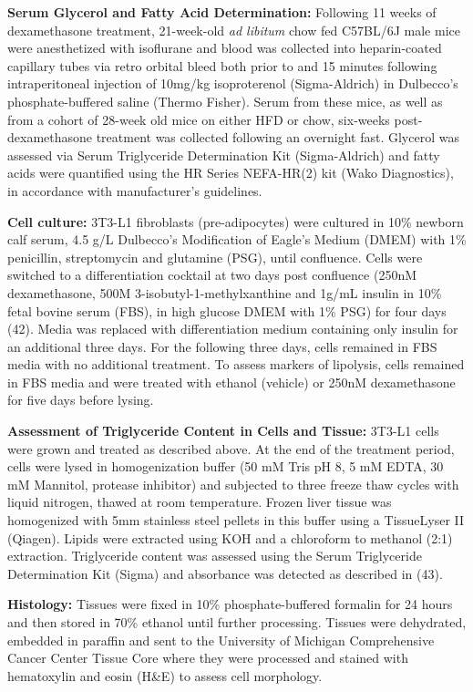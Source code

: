 \documentclass[11pt]{article} %
\begin{document}
\textbf{Serum Glycerol and Fatty Acid Determination:} Following 11 weeks
of dexamethasone treatment, 21-week-old \emph{ad libitum} chow fed
C57BL/6J male mice were anesthetized with isoflurane and blood was
collected into heparin-coated capillary tubes via retro orbital bleed
both prior to and 15 minutes following intraperitoneal injection of
10mg/kg isoproterenol (Sigma-Aldrich) in Dulbecco's phosphate-buffered
saline (Thermo Fisher). Serum from these mice, as well as from a cohort
of 28-week old mice on either HFD or chow, six-weeks post-dexamethasone
treatment was collected following an overnight fast. Glycerol was
assessed via Serum Triglyceride Determination Kit (Sigma-Aldrich) and
fatty acids were quantified using the HR Series NEFA-HR(2) kit (Wako
Diagnostics), in accordance with manufacturer's guidelines.

\textbf{Cell culture:} 3T3-L1 fibroblasts (pre-adipocytes) were cultured
in 10\% newborn calf serum, 4.5 g/L Dulbecco's Modification of Eagle's
Medium (DMEM) with 1\% penicillin, streptomycin and glutamine (PSG),
until confluence. Cells were switched to a differentiation cocktail at
two days post confluence (250nM dexamethasone, 500M
3-isobutyl-1-methylxanthine and 1g/mL insulin in 10\% fetal bovine
serum (FBS), in high glucose DMEM with 1\% PSG) for four days (42).
Media was replaced with differentiation medium containing only insulin
for an additional three days. For the following three days, cells
remained in FBS media with no additional treatment. To assess markers of
lipolysis, cells remained in FBS media and were treated with ethanol
(vehicle) or 250nM dexamethasone for five days before lysing.

\textbf{Assessment of Triglyceride Content in Cells and Tissue:} 3T3-L1
cells were grown and treated as described above. At the end of the
treatment period, cells were lysed in homogenization buffer (50 mM Tris
pH 8, 5 mM EDTA, 30 mM Mannitol, protease inhibitor) and subjected to
three freeze thaw cycles with liquid nitrogen, thawed at room
temperature. Frozen liver tissue was homogenized with 5mm stainless
steel pellets in this buffer using a TissueLyser II (Qiagen). Lipids
were extracted using KOH and a chloroform to methanol (2:1) extraction.
Triglyceride content was assessed using the Serum Triglyceride
Determination Kit (Sigma) and absorbance was detected as described in
(43).

\textbf{Histology:} Tissues were fixed in 10\% phosphate-buffered
formalin for 24 hours and then stored in 70\% ethanol until further
processing. Tissues were dehydrated, embedded in paraffin and sent to
the University of Michigan Comprehensive Cancer Center Tissue Core where
they were processed and stained with hematoxylin and eosin (H\&E) to
assess cell morphology.
\end{document}
